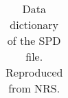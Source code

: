 \documentclass[12pt]{article}
\begin{document}
\begin{longtable}{|| m{} | m{} | m{}||}
\caption{Data dictionary of the SPD file. Reproduced from NRS.} %
\label{tab:SPD_DICT}
\end{longtable}


%
%
%
\end{document}
